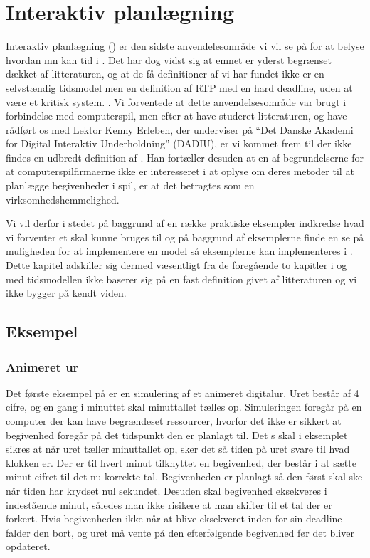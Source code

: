 \chapter{Interaktiv planlægning}
\label{chap:is}

Interaktiv planlægning (\is) er den sidste anvendelesområde vi vil se på for at belyse hvordan mn kan tid i \pycsp. Det har dog vidst sig at emnet er yderst begrænset dækket af litteraturen, og at de få definitioner af \is vi har fundet ikke er en selvstændig tidsmodel men en definition af RTP med en hard deadline, uden at være et kritisk system. \cite{?}. Vi forventede at dette anvendelsesområde var brugt i forbindelse med computerspil, men efter at have studeret litteraturen, og have rådført os med Lektor Kenny Erleben, der underviser på  ``Det Danske Akademi for Digital Interaktiv Underholdning'' (DADIU), er vi kommet frem til der ikke findes en udbredt definition af \is. Han fortæller desuden at en af begrundelserne for at computerspilfirmaerne ikke er interesseret i at oplyse om deres metoder til at planlægge begivenheder i spil, er at det  betragtes som en  virksomhedshemmelighed. 

Vi vil derfor i stedet på baggrund af en række praktiske eksempler indkredse hvad vi forventer et \is skal kunne bruges til og på  baggrund af eksemplerne finde en se på muligheden for at implementere en model så eksemplerne kan implementeres i \pycsp. Dette kapitel adskiller sig dermed væsentligt fra de foregående to kapitler i og med tidsmodellen  ikke baserer sig på en fast definition givet af litteraturen og vi ikke bygger på kendt viden.

\section{Eksempel}

\subsection{Animeret ur}
Det første eksempel på \is er en  simulering af et animeret digitalur. Uret består af 4 cifre, og en gang i minuttet skal minuttallet tælles op. Simuleringen foregår på en computer der kan have begrændeset ressourcer, hvorfor det ikke er sikkert at begivenhed foregår på det tidspunkt den er planlagt til.  Det s skal i eksemplet sikres at når uret tæller minuttallet op, sker det så tiden på uret svare til hvad klokken er.  Der er til  hvert minut tilknyttet en begivenhed, der består i at sætte minut cifret til det nu korrekte tal. Begivenheden er planlagt så den først skal ske når tiden har krydset nul sekundet. Desuden skal begivenhed eksekveres i indestående minut, således man ikke risikere at man skifter til et tal der er forkert. Hvis begivenheden ikke når at blive eksekveret inden for sin deadline falder den bort, og uret må vente på den efterfølgende begivenhed før det bliver opdateret.

